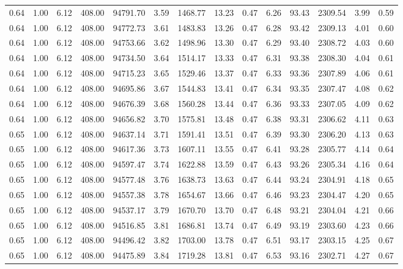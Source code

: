 \begin{table}[!ht]
\begin{tabular}{rrrrrrrrrrrrrr}
0.64 & 1.00 & 6.12 & 408.00 & 94791.70 & 3.59 & 1468.77 & 13.23 & 0.47 & 6.26 & 93.43 & 2309.54 & 3.99 & 0.59 \\
0.64 & 1.00 & 6.12 & 408.00 & 94772.73 & 3.61 & 1483.83 & 13.26 & 0.47 & 6.28 & 93.42 & 2309.13 & 4.01 & 0.60 \\
0.64 & 1.00 & 6.12 & 408.00 & 94753.66 & 3.62 & 1498.96 & 13.30 & 0.47 & 6.29 & 93.40 & 2308.72 & 4.03 & 0.60 \\
0.64 & 1.00 & 6.12 & 408.00 & 94734.50 & 3.64 & 1514.17 & 13.33 & 0.47 & 6.31 & 93.38 & 2308.30 & 4.04 & 0.61 \\
0.64 & 1.00 & 6.12 & 408.00 & 94715.23 & 3.65 & 1529.46 & 13.37 & 0.47 & 6.33 & 93.36 & 2307.89 & 4.06 & 0.61 \\
0.64 & 1.00 & 6.12 & 408.00 & 94695.86 & 3.67 & 1544.83 & 13.41 & 0.47 & 6.34 & 93.35 & 2307.47 & 4.08 & 0.62 \\
0.64 & 1.00 & 6.12 & 408.00 & 94676.39 & 3.68 & 1560.28 & 13.44 & 0.47 & 6.36 & 93.33 & 2307.05 & 4.09 & 0.62 \\
0.64 & 1.00 & 6.12 & 408.00 & 94656.82 & 3.70 & 1575.81 & 13.48 & 0.47 & 6.38 & 93.31 & 2306.62 & 4.11 & 0.63 \\
0.65 & 1.00 & 6.12 & 408.00 & 94637.14 & 3.71 & 1591.41 & 13.51 & 0.47 & 6.39 & 93.30 & 2306.20 & 4.13 & 0.63 \\
0.65 & 1.00 & 6.12 & 408.00 & 94617.36 & 3.73 & 1607.11 & 13.55 & 0.47 & 6.41 & 93.28 & 2305.77 & 4.14 & 0.64 \\
0.65 & 1.00 & 6.12 & 408.00 & 94597.47 & 3.74 & 1622.88 & 13.59 & 0.47 & 6.43 & 93.26 & 2305.34 & 4.16 & 0.64 \\
0.65 & 1.00 & 6.12 & 408.00 & 94577.48 & 3.76 & 1638.73 & 13.63 & 0.47 & 6.44 & 93.24 & 2304.91 & 4.18 & 0.65 \\
0.65 & 1.00 & 6.12 & 408.00 & 94557.38 & 3.78 & 1654.67 & 13.66 & 0.47 & 6.46 & 93.23 & 2304.47 & 4.20 & 0.65 \\
0.65 & 1.00 & 6.12 & 408.00 & 94537.17 & 3.79 & 1670.70 & 13.70 & 0.47 & 6.48 & 93.21 & 2304.04 & 4.21 & 0.66 \\
0.65 & 1.00 & 6.12 & 408.00 & 94516.85 & 3.81 & 1686.81 & 13.74 & 0.47 & 6.49 & 93.19 & 2303.60 & 4.23 & 0.66 \\
0.65 & 1.00 & 6.12 & 408.00 & 94496.42 & 3.82 & 1703.00 & 13.78 & 0.47 & 6.51 & 93.17 & 2303.15 & 4.25 & 0.67 \\
0.65 & 1.00 & 6.12 & 408.00 & 94475.89 & 3.84 & 1719.28 & 13.81 & 0.47 & 6.53 & 93.16 & 2302.71 & 4.27 & 0.67 \\

\end{tabular}
\end{table}
